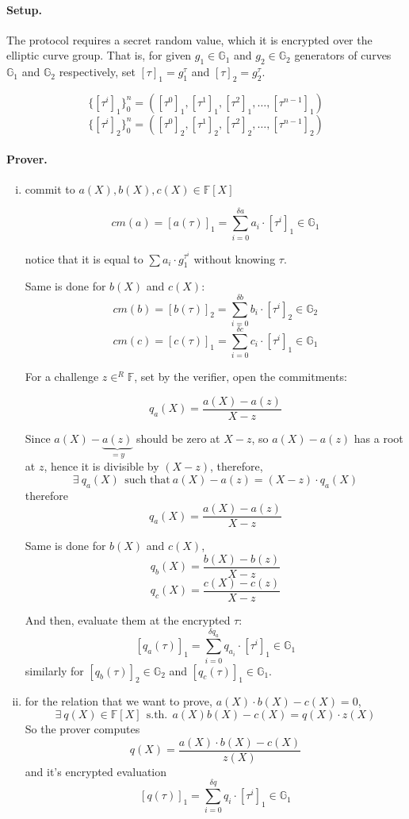 \documentclass{article}
\begin{document}
\paragraph{Setup.}
The protocol requires a secret random value, which it is encrypted over the elliptic curve group. That is, for given $g_1 \in \mathbb{G}_1$ and $g_2 \in \mathbb{G}_2$ generators of curves $\mathbb{G}_1$ and $\mathbb{G}_2$ respectively, set $[\tau]_1 = g_1^\tau$ and $[\tau]_2 =g_2^\tau$.

$$\{ [\tau^i]_1 \}_0^n = ( [\tau^0]_1, [\tau^1]_1, [\tau^2]_1, \ldots, [\tau^{n-1}]_1)$$
$$\{ [\tau^i]_2 \}_0^n = ( [\tau^0]_2, [\tau^1]_2, [\tau^2]_2, \ldots, [\tau^{n-1}]_2)$$

\paragraph{Prover.}
\begin{enumerate}[i.]
    \item commit to $a(X), b(X), c(X) \in \mathbb{F}[X]$

	$$cm(a) = [a(\tau)]_1 = \sum_{i=0}^{\delta a} a_i \cdot [\tau^i]_1 \in \mathbb{G}_1$$

	notice that it is equal to $\sum a_i \cdot g_1^{\tau^i}$ without knowing $\tau$.
	
	Same is done for $b(X)$ and $c(X)$:
	$$cm(b) = [b(\tau)]_2 = \sum_{i=0}^{\delta b} b_i \cdot [\tau^i]_2 \in \mathbb{G}_2$$
	$$cm(c) = [c(\tau)]_1 = \sum_{i=0}^{\delta c} c_i \cdot [\tau^i]_1 \in \mathbb{G}_1$$


	For a challenge $z \in^R \mathbb{F}$, set by the verifier, open the commitments:

	$$q_a(X) = \frac{a(X) - a(z)}{X-z}$$

	Since $a(X)-\underbrace{a(z)}_{=y}$ should be zero at $X-z$, so $a(X) - a(z)$ has a root at $z$, hence it is divisible by $(X-z)$, therefore,
	$$\exists ~q_a(X) ~~\text{such that}~ a(X)-a(z) = (X-z) \cdot q_a(X)$$
	therefore
	$$q_a(X) = \frac{a(X)-a(z)}{X-z}$$

	Same is done for $b(X)$ and $c(X)$,
	$$q_b(X) = \frac{b(X)-b(z)}{X-z}$$
	$$q_c(X) = \frac{c(X)-c(z)}{X-z}$$

	And then, evaluate them at the encrypted $\tau$:
	$$[q_a(\tau)]_1 = \sum_{i=0}^{\delta q_a} q_{a_i} \cdot [\tau^i]_1 \in \mathbb{G}_1$$
	similarly for $[q_b(\tau)]_2 \in \mathbb{G}_2$ and $[q_c(\tau)]_1 \in \mathbb{G}_1$.

    \item for the relation that we want to prove, $a(X) \cdot b(X) - c(X)=0$,
	$$\exists~ q(X) \in \mathbb{F}[X] ~~\text{s.th.}~~ a(X)b(X)-c(X)=q(X) \cdot z(X)$$
	So the prover computes
	$$q(X) = \frac{a(X) \cdot b(X) - c(X)}{z(X)}$$
	and it's encrypted evaluation
	$$[q(\tau)]_1 = \sum_{i=0}^{\delta q} q_i \cdot [\tau^i]_1 \in \mathbb{G}_1$$
\end{enumerate}
\end{document}
